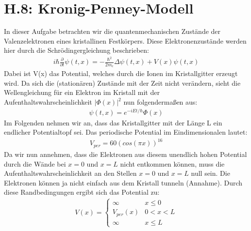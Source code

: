 \documentclass[ngerman]{scrartcl}
\begin{document}
\section{H.8: Kronig-Penney-Modell}
In dieser Aufgabe betrachten wir die quantenmechanischen Zustände der Valenzelektronen eines kristallinen Festkörpers. Diese Elektronenzustände werden hier durch die Schrödingergleichung beschrieben:
\begin{align}
i\hbar \frac{\partial}{\partial t} \psi(t,x) = -\frac{\hbar^2}{2m_e} \Delta \psi(t,x) + V(x) \psi(t,x)
\end{align}
Dabei ist V(x) das Potential, welches durch die Ionen im Kristallgitter erzeugt wird. 
Da sich die (stationären) Zustände mit der Zeit nicht verändern, sieht die Wellengleichung für ein Elektron im Kristall mit der Aufenthaltswahrscheinlichkeit ${|\Phi(x)|}^2$ nun folgendermaßen aus:
\begin{align}
\psi(t,x) = e^{-iEt/\hbar}\Phi(x)
\end{align}
Im Folgenden nehmen wir an, dass das Kristallgitter mit der Länge L ein endlicher Potentialtopf sei. Das periodische Potential im Eindimensionalen lautet:
\begin{align}
V_{per} = 60 (cos(\pi x))^{16}
\end{align}
Da wir nun annehmen, dass die Elektronen aus diesem unendlich hohen Potential durch die Wände bei $x = 0$ und $x = L$ nicht entkommen können, muss die Aufenthaltswahrscheinlichkeit an den Stellen $x = 0$ und $x = L$ null sein. Die Elektronen können ja nicht einfach aus dem Kristall tunneln (Annahme).
Durch diese Randbedingungen ergibt sich das Potential zu:
\begin{align}
V(x)=\left\{\begin{array}{lll} \infty & x \leq 0\\
V_{per}(x) & 0 < x < L\\
\infty & x \leq L \end{array}\right. 
\end{align}
\end{document}
